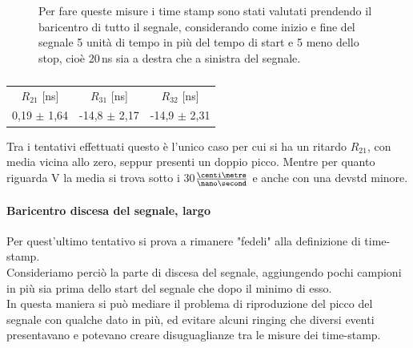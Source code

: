 \documentclass[a4paper,twocolumn]{article}
\begin{document}
\begin{figure}[H]
\begin{center}
\begin{subfigure}[b]{0.4\textwidth}
         \caption{}
         \label{fig:VLargo}
     \end{subfigure}
     \end{center}
     \caption{Per fare queste misure i time stamp sono stati valutati prendendo il baricentro di tutto il segnale, considerando come inizio e fine del segnale 5 unità di tempo in più del tempo di start e 5 meno dello stop, cioè 20\,ns sia a destra che a sinistra del segnale.}        
     \label{fig:Largo}
\end{figure}

\begin{table}[H]
\begin{tabular}{c|c|c}
$R_{21}$ [ns] & $R_{31}$ [ns] & $R_{32}$ [ns] \\
\hfill
0,19 $\pm$ 1,64 & -14,8 $\pm$ 2,17 & -14,9 $\pm$ 2,31
\hfill
\end{tabular}
\caption{}
\label{tab:RitLargo}
\end{table}

Tra i tentativi effettuati questo è l'unico caso per cui si ha un ritardo $R_{21}$, con media vicina allo zero, seppur presenti un doppio picco. Mentre per quanto riguarda V la media si trova sotto i 30$\frac{\centi\metre}{\nano\second}$ e anche con una devstd minore.

\paragraph{Baricentro discesa del segnale, largo}
Per quest'ultimo tentativo si prova a rimanere "fedeli" alla definizione di time-stamp.\\ Consideriamo perciò la parte di discesa del segnale, aggiungendo pochi campioni in più sia prima dello start del segnale che dopo il minimo di esso.\\
In questa maniera si può mediare il problema di riproduzione del picco del segnale con qualche dato in più, ed evitare alcuni ringing che diversi eventi presentavano e potevano creare disuguaglianze tra le misure dei time-stamp.
\end{document}
